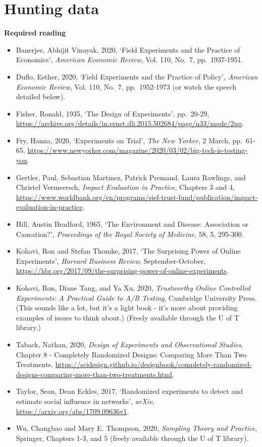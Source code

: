 \documentclass[
]{book}
\providecommand{\tightlist}{%
  \setlength{\itemsep}{0pt}\setlength{\parskip}{0pt}}
\begin{document}
\hypertarget{hunting-data}{%
\chapter{Hunting data}\label{hunting-data}}

\textbf{Required reading}

\begin{itemize}
\tightlist
\item
  Banerjee, Abhijit Vinayak, 2020, `Field Experiments and the Practice of Economics', \emph{American Economic Review}, Vol. 110, No.~7, pp.~1937-1951.
\item
  Duflo, Esther, 2020, `Field Experiments and the Practice of Policy', \emph{American Economic Review}, Vol. 110, No.~7, pp.~1952-1973 (or watch the speech detailed below).
\item
  Fisher, Ronald, 1935, `The Design of Experiments', pp.~20-29, \url{https://archive.org/details/in.ernet.dli.2015.502684/page/n33/mode/2up}.
\item
  Fry, Hanna, 2020, `Experiments on Trial', \emph{The New Yorker}, 2 March, pp.~61-65, \url{https://www.newyorker.com/magazine/2020/03/02/big-tech-is-testing-you}.
\item
  Gertler, Paul, Sebastian Martinez, Patrick Premand, Laura Rawlings, and Christel Vermeersch, \emph{Impact Evaluation in Practice}, Chapters 3 and 4, \url{https://www.worldbank.org/en/programs/sief-trust-fund/publication/impact-evaluation-in-practice}.
\item
  Hill, Austin Bradford, 1965, `The Environment and Disease: Association or Causation?', \emph{Proceedings of the Royal Society of Medicine}, 58, 5, 295-300.
\item
  Kohavi, Ron and Stefan Thomke, 2017, `The Surprising Power of Online Experiments', \emph{Harvard Business Review}, September-October, \url{https://hbr.org/2017/09/the-surprising-power-of-online-experiments}.
\item
  Kohavi, Ron, Diane Tang, and Ya Xu, 2020, \emph{Trustworthy Online Controlled Experiments: A Practical Guide to A/B Testing}, Cambridge University Press. (This sounds like a lot, but it's a light book - it's more about providing examples of issues to think about.) (Freely available through the U of T library.)
\item
  Taback, Nathan, 2020, \emph{Design of Experiments and Observational Studies}, Chapter 8 - Completely Randomized Designs: Comparing More Than Two Treatments, \url{https://scidesign.github.io/designbook/completely-randomized-designs-comparing-more-than-two-treatments.html}.
\item
  Taylor, Sean, Dean Eckles, 2017, `Randomized experiments to detect and estimate social influence in networks', \emph{arXiv}, \url{https://arxiv.org/abs/1709.09636v1}.
\item
  Wu, Changbao and Mary E. Thompson, 2020, \emph{Sampling Theory and Practice}, Springer, Chapters 1-3, and 5 (freely available through the U of T library).
\end{itemize}
\end{document}
